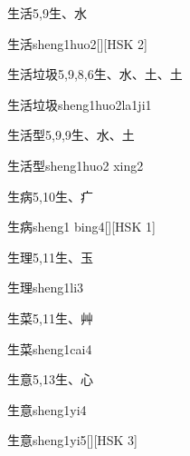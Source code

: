 \begin{entry}{生活}{5,9}{⽣、⽔}
  \begin{phonetics}{生活}{sheng1huo2}[][HSK 2]
  \end{phonetics}
\end{entry}

\begin{entry}{生活垃圾}{5,9,8,6}{⽣、⽔、⼟、⼟}
  \begin{phonetics}{生活垃圾}{sheng1huo2la1ji1}
  \end{phonetics}
\end{entry}

\begin{entry}{生活型}{5,9,9}{⽣、⽔、⼟}
  \begin{phonetics}{生活型}{sheng1huo2 xing2}
  \end{phonetics}
\end{entry}

\begin{entry}{生病}{5,10}{⽣、⽧}
  \begin{phonetics}{生病}{sheng1 bing4}[][HSK 1]
  \end{phonetics}
\end{entry}

\begin{entry}{生理}{5,11}{⽣、⽟}
  \begin{phonetics}{生理}{sheng1li3}
  \end{phonetics}
\end{entry}

\begin{entry}{生菜}{5,11}{⽣、⾋}
  \begin{phonetics}{生菜}{sheng1cai4}
  \end{phonetics}
\end{entry}

\begin{entry}{生意}{5,13}{⽣、⼼}
  \begin{phonetics}{生意}{sheng1yi4}
  \end{phonetics}
  \begin{phonetics}{生意}{sheng1yi5}[][HSK 3]
  \end{phonetics}
\end{entry}

